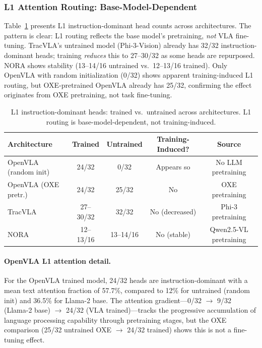 \documentclass[letterpaper]{article}
\begin{document}
\subsubsection{L1 Attention Routing: Base-Model-Dependent}
\label{sec:l1-heads}

Table~\ref{tab:l1-heads} presents L1 instruction-dominant head counts across architectures.
The pattern is clear: L1 routing reflects the base model's pretraining, \emph{not} VLA fine-tuning.
TracVLA's untrained model (Phi-3-Vision) already has 32/32 instruction-dominant heads; training \emph{reduces} this to 27--30/32 as some heads are repurposed.
NORA shows stability (13--14/16 untrained vs.\ 12--13/16 trained).
Only OpenVLA with random initialization (0/32) shows apparent training-induced L1 routing, but OXE-pretrained OpenVLA already has 25/32, confirming the effect originates from OXE pretraining, not task fine-tuning.

\begin{table}[t]
\centering
\caption{L1 instruction-dominant heads: trained vs.\ untrained across architectures. L1 routing is base-model-dependent, not training-induced.}
\label{tab:l1-heads}
\small
\begin{tabular}{lcccc}
\toprule
Architecture & Trained & Untrained & Training-Induced? & Source \\
\midrule
OpenVLA (random init) & 24/32 & 0/32  & Appears so & No LLM pretraining \\
OpenVLA (OXE pretr.)  & 24/32 & 25/32 & No         & OXE pretraining \\
TracVLA               & 27--30/32 & 32/32 & No (decreased) & Phi-3 pretraining \\
NORA                  & 12--13/16 & 13--14/16 & No (stable) & Qwen2.5-VL pretraining \\
\bottomrule
\end{tabular}
\end{table}

\paragraph{OpenVLA L1 attention detail.}
For the OpenVLA trained model, 24/32 heads are instruction-dominant with a mean text attention fraction of 57.7\%, compared to 12\% for untrained (random init) and 36.5\% for Llama-2 base.
The attention gradient---0/32 $\to$ 9/32 (Llama-2 base) $\to$ 24/32 (VLA trained)---tracks the progressive accumulation of language processing capability through pretraining stages, but the OXE comparison (25/32 untrained OXE $\to$ 24/32 trained) shows this is not a fine-tuning effect.
\end{document}
